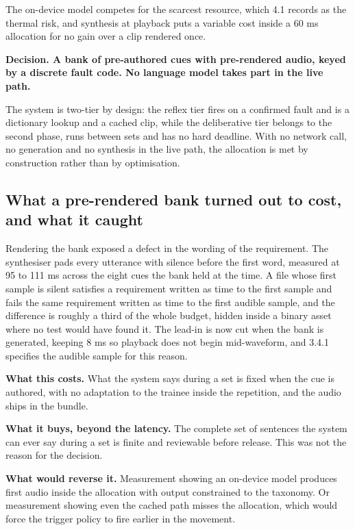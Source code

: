 The on-device model competes for the scarcest resource, which 4.1 records as the thermal risk, and synthesis at playback puts a variable cost inside a 60 ms allocation for no gain over a clip rendered once.

\textbf{Decision. A bank of pre-authored cues with pre-rendered audio, keyed by a discrete fault code. No language model takes part in the live path.}

The system is two-tier by design: the reflex tier fires on a confirmed fault and is a dictionary lookup and a cached clip, while the deliberative tier belongs to the second phase, runs between sets and has no hard deadline. With no network call, no generation and no synthesis in the live path, the allocation is met by construction rather than by optimisation.

\subsection{What a pre-rendered bank turned out to cost, and what it caught}
\label{sec:4.4.1}

Rendering the bank exposed a defect in the wording of the requirement. The synthesiser pads every utterance with silence before the first word, measured at 95 to 111 ms across the eight cues the bank held at the time. A file whose first sample is silent satisfies a requirement written as time to the first sample and fails the same requirement written as time to the first audible sample, and the difference is roughly a third of the whole budget, hidden inside a binary asset where no test would have found it. The lead-in is now cut when the bank is generated, keeping 8 ms so playback does not begin mid-waveform, and 3.4.1 specifies the audible sample for this reason.

\textbf{What this costs.} What the system says during a set is fixed when the cue is authored, with no adaptation to the trainee inside the repetition, and the audio ships in the bundle.

\textbf{What it buys, beyond the latency.} The complete set of sentences the system can ever say during a set is finite and reviewable before release. This was not the reason for the decision.

\textbf{What would reverse it.} Measurement showing an on-device model produces first audio inside the allocation with output constrained to the taxonomy. Or measurement showing even the cached path misses the allocation, which would force the trigger policy to fire earlier in the movement.

